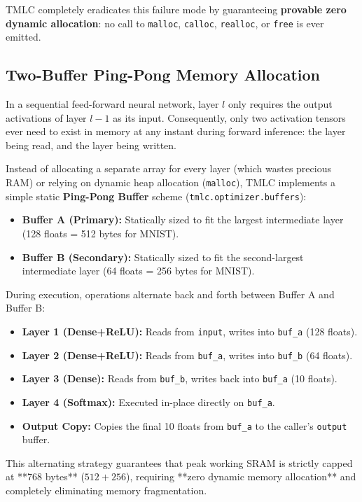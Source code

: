 \documentclass[11pt,a4paper]{article}
\begin{document}
TMLC completely eradicates this failure mode by guaranteeing \textbf{provable zero dynamic allocation}: no call to \texttt{malloc}, \texttt{calloc}, \texttt{realloc}, or \texttt{free} is ever emitted.

\subsection{Two-Buffer Ping-Pong Memory Allocation}
In a sequential feed-forward neural network, layer $l$ only requires the output activations of layer $l-1$ as its input. Consequently, only two activation tensors ever need to exist in memory at any instant during forward inference: the layer being read, and the layer being written.

Instead of allocating a separate array for every layer (which wastes precious RAM) or relying on dynamic heap allocation (\texttt{malloc}), TMLC implements a simple static \textbf{Ping-Pong Buffer} scheme (\texttt{tmlc.optimizer.buffers}):
\begin{itemize}[leftmargin=*]
    \item \textbf{Buffer A (Primary):} Statically sized to fit the largest intermediate layer (128 floats = 512 bytes for MNIST).
    \item \textbf{Buffer B (Secondary):} Statically sized to fit the second-largest intermediate layer (64 floats = 256 bytes for MNIST).
\end{itemize}

During execution, operations alternate back and forth between Buffer A and Buffer B:
\begin{itemize}[leftmargin=*]
    \item \textbf{Layer 1 (Dense+ReLU):} Reads from \texttt{input}, writes into \texttt{buf\_a} (128 floats).
    \item \textbf{Layer 2 (Dense+ReLU):} Reads from \texttt{buf\_a}, writes into \texttt{buf\_b} (64 floats).
    \item \textbf{Layer 3 (Dense):} Reads from \texttt{buf\_b}, writes back into \texttt{buf\_a} (10 floats).
    \item \textbf{Layer 4 (Softmax):} Executed in-place directly on \texttt{buf\_a}.
    \item \textbf{Output Copy:} Copies the final 10 floats from \texttt{buf\_a} to the caller's \texttt{output} buffer.
\end{itemize}

This alternating strategy guarantees that peak working SRAM is strictly capped at **768 bytes** ($512 + 256$), requiring **zero dynamic memory allocation** and completely eliminating memory fragmentation.
\end{document}
